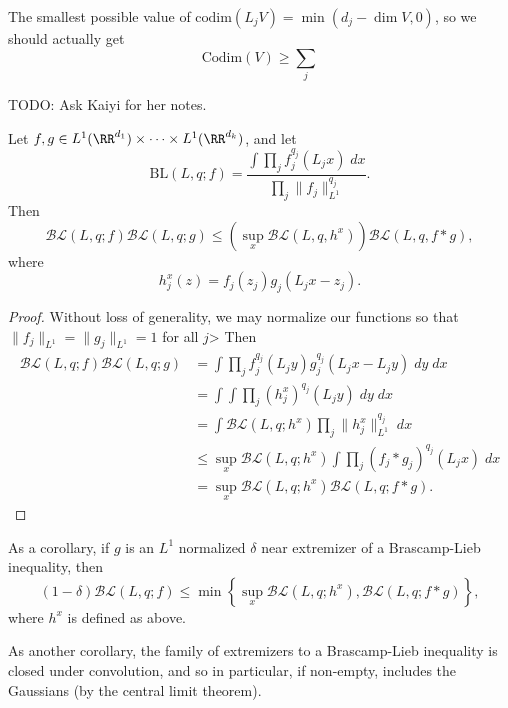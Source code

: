 The smallest possible value of $\text{codim}(L_j V) = \min(d_j - \dim V, 0)$, so we should actually get
%
\[ \text{Codim}(V) \geq \sum_j \]


TODO: Ask Kaiyi for her notes.


\begin{theorem}
    Let $f,g \in L^1(\RR^{d_1}) \times \dots \times L^1(\RR^{d_k})$, and let
    \[  \text{BL}(L,q;f) = \frac{\int \prod_j f_j^{q_j}(L_j x)\; dx }{\prod_j \| f_j \|_{L^1}^{q_j}}. \]
    Then
    \[ \mathcal{BL}(L,q;f) \mathcal{BL}(L,q;g) \leq \left( \sup_x \mathcal{BL}(L,q,h^x) \right) \mathcal{BL}(L,q,f * g), \]
    where 
    \[ h^x_j(z) = f_j(z_j) g_j(L_j x - z_j). \]
\end{theorem}
\begin{proof}
    Without loss of generality, we may normalize our functions so that $\| f_j \|_{L^1} = \| g_j \|_{L^1} = 1$ for all $j$> Then
    \begin{align*}
        \mathcal{BL}(L,q;f) \mathcal{BL}(L,q;g) &= \int \prod_j f_j^{q_j}(L_j y) g_j^{q_j}(L_j x - L_j y)\; dy\; dx\\
        &= \int \int \prod_j (h_j^x)^{q_j}(L_j y)\; dy\; dx\\
        &= \int \mathcal{BL}(L, q; h^x) \prod_j \| h_j^x \|_{L^1}^{q_j}\; dx\\
        &\leq \sup_x \mathcal{BL}(L,q;h^x) \int \prod_j (f_j * g_j)^{q_j}(L_j x)\; dx\\
        &= \sup_x \mathcal{BL}(L,q;h^x) \mathcal{BL}(L,q;f * g).
    \end{align*}
\end{proof}

As a corollary, if $g$ is an $L^1$ normalized $\delta$ near extremizer of a Brascamp-Lieb inequality, then
%
\[ ( 1 - \delta) \mathcal{BL}(L,q;f) \leq \min \left\{ \sup_x \mathcal{BL}(L,q;h^x), \mathcal{BL}(L,q;f * g) \right\}, \]
%
where $h^x$ is defined as above.

As another corollary, the family of extremizers to a Brascamp-Lieb inequality is closed under convolution, and so in particular, if non-empty, includes the Gaussians (by the central limit theorem).

